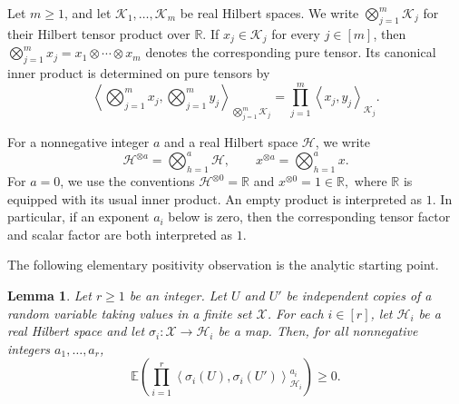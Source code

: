 \documentclass[twoside,12pt]{article}
\newtheorem{lemma}[theorem]{Lemma}
\theoremstyle{definition}
\theoremstyle{remark}
\newcommand{\E}{\mathbb E}
\newcommand{\R}{\mathbb R}
\newcommand{\1}{\mathbf 1}
\newcommand{\ip}[2]{\left\langle #1,#2\right\rangle}
\newcommand{\tensor}{\otimes}
\begin{document}
Let $m\ge1$, and let $\mathcal K_1,\ldots,\mathcal K_m$ be real Hilbert
spaces. We write $\bigotimes_{j=1}^m\mathcal K_j$ for their Hilbert tensor
product over $\R$. If $x_j\in\mathcal K_j$ for every $j\in[m]$, then
$\bigotimes_{j=1}^m x_j=x_1\tensor\cdots\tensor x_m$
denotes the corresponding pure tensor. Its canonical inner product is
determined on pure tensors by
\[
 \ip{\bigotimes_{j=1}^m x_j}{\bigotimes_{j=1}^m y_j}_{\bigotimes_{j=1}^m\mathcal K_j}
 =\prod_{j=1}^m\ip{x_j}{y_j}_{\mathcal K_j}.
\]

For a nonnegative integer $a$ and a real Hilbert space $\mathcal H$, we write
\[
 \mathcal H^{\tensor a}=\bigotimes_{h=1}^a\mathcal H,
 \qquad
 x^{\tensor a}=\bigotimes_{h=1}^a x.
\]
For $a=0$, we use the conventions
$
 \mathcal H^{\tensor0}=\R$ and $
 x^{\tensor0}=1\in\R,
$
where $\R$ is equipped with its usual inner product. An empty product is
interpreted as $1$. In particular, if an exponent $a_i$ below is zero, then
the corresponding tensor factor and scalar factor are both interpreted as
$1$.

The following elementary positivity observation is the analytic starting
point.

\begin{lemma}\label{lem:positive-moments}
Let $r\ge1$ be an integer. Let $U$ and $U'$ be independent copies of a
random variable taking values in a finite set $\mathcal X$. For each
$i\in[r]$, let $\mathcal H_i$ be a real Hilbert space and let
$\sigma_i:\mathcal X\to\mathcal H_i$ be a map. Then, for all nonnegative
integers $a_1,\ldots,a_r$,
\begin{equation}\label{eq:positive-moments}
 \E\left(\prod_{i=1}^r
 \ip{\sigma_i(U)}{\sigma_i(U')}_{\mathcal H_i}^{a_i}\right)
 \ge0.
\end{equation}
\end{lemma}
\end{document}
